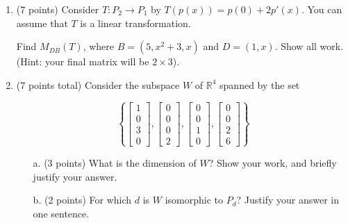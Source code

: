 \documentclass[12pt]{extarticle}
\begin{document}
\newpage

\begin{enumerate}





\newpage



\item (7 points) Consider $T:P_2\to P_1$ by $T(p(x))=p(0)+2p'(x)$. You can assume that $T$ is a linear transformation.

Find $M_{DB}(T)$, where $B=(5,x^2+3,x)$ and $D=(1,x)$. Show all work. \\(Hint: your final matrix will be $2\times 3$).


\newpage


\item  (7 points total)   
Consider the subspace $W$ of $\mathbb{R}^4$ spanned by the set 


$$\left\{\begin{bmatrix} 1\\ 0 \\3 \\0\end{bmatrix}, \begin{bmatrix} 0 \\ 0 \\0 \\ 2\end{bmatrix}, \begin{bmatrix} 0\\ 0 \\ 1 \\ 0\end{bmatrix}, \begin{bmatrix} 0\\ 0 \\ 2\\ 6\end{bmatrix}\right\} $$ %


\begin{itemize}\item[a.] (3 points)
What is the dimension of $W$? Show your work, and briefly justify your answer. 

\vfill


\item[b.] (2 points) For which $d$ is $W$ isomorphic to $P_d$? Justify your answer in one sentence.

\vspace{1.5in}


\end{itemize}
\end{enumerate}
\end{document}
